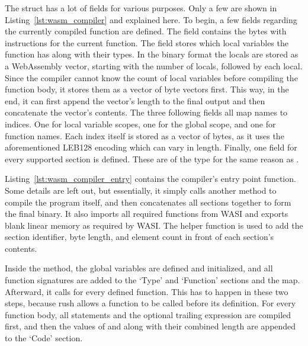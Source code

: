 The  struct has a lot of fields for various purposes.
Only a few are shown in Listing~\ref{lst:wasm_compiler} and explained here.
To begin, a few fields regarding the currently compiled function are defined.
The field  contains the bytes with instructions for the current function.
The field  stores which local variables the function has along with their types.
In the binary format the locals are stored as a WebAssembly vector, starting with the number of locals, followed by each local.
Since the compiler cannot know the count of local variables before compiling the function body, it stores them as a vector of byte vectors first.
This way, in the end, it can first append the vector's length to the final output and then concatenate the vector's contents.
The three following fields all map names to indices.
One for local variable scopes, one for the global scope, and one for function names.
Each index itself is stored as a vector of bytes, as it uses the aforementioned  LEB128 encoding which can vary in length.
Finally, one field for every supported section is defined.
These are of the type  for the same reason as .


Listing~\ref{lst:wasm_compiler_entry} contains the compiler's entry point function.
Some details are left out, but essentially, it simply calls another method to compile the program itself, and then concatenates all sections together to form the final binary.
It also imports all required functions from WASI and exports blank linear memory as required by WASI.
The  helper function is used to add the section identifier, byte length, and element count in front of each section's contents.


Inside the  method, the global variables are defined and initialized, and all function signatures are added to the `Type' and `Function' sections and the  map.
Afterward, it calls  for every defined function.
This has to happen in these two steps, because rush allows a function to be called before its definition.
For every function body, all statements and the optional trailing expression are compiled first, and then the values of  and  along with their combined length are appended to the `Code' section.

